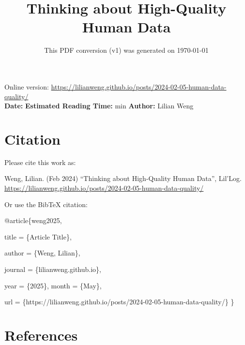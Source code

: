 \documentclass[12pt]{article}
\title{Thinking about High-Quality Human Data}
\date{This PDF conversion (v1) was generated on \today\footnotemark}
\begin{document}
\maketitle
\begin{center}
    Online version: \url{https://lilianweng.github.io/posts/2024-02-05-human-data-quality/} \\
    \textbf{Date:} \quad
    \textbf{Estimated Reading Time:}  min \quad
    \textbf{Author:} Lilian Weng
\end{center}




\newpage
\tableofcontents
\newpage
\vspace{1em}
\n\n\n\section{Citation}
Please cite this work as:

\begin{tcolorbox}[colback=black!5!white, colframe=black!80!white, boxrule=0.5pt, arc=2mm, left=1mm, right=1mm, top=1mm, bottom=1mm]
  Weng, Lilian. (Feb 2024) ``Thinking about High-Quality Human Data'', Lil'Log. \url{https://lilianweng.github.io/posts/2024-02-05-human-data-quality/}
  \end{tcolorbox}

Or use the BibTeX citation:

\begin{tcolorbox}[
    colback=black!5!white,
    colframe=black!80!white,
    boxrule=0.5pt,
    arc=2mm,
    left=1mm,
    right=1mm,
    top=1mm,
    bottom=1mm,
    listing only,
    listing options={
      basicstyle=\ttfamily\footnotesize,
      breaklines=true,
      literate={\{}{{\char`\{}}1 {\}}{{\char`\}}}1
    }
  ]
  @article\{weng2025,

    title   = \{Article Title\},

    author  = \{Weng, Lilian\},

    journal = \{lilianweng.github.io\},

    year    = \{2025\},
    month   = \{May\},

    url     = \{https://lilianweng.github.io/posts/2024-02-05-human-data-quality/\}\n
  \}
  \end{tcolorbox}

\newpage
\section{References}

\n
\end{document}
